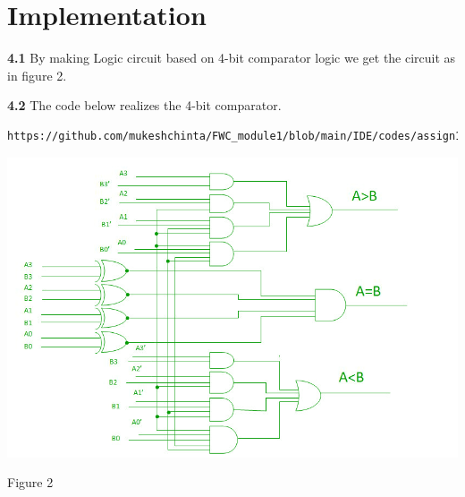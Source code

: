 \documentclass[10pt, a4paper]{article}
\begin{document}
\section{Implementation}
\textbf{4.1}
By making Logic circuit based on 4-bit comparator logic we get the circuit as in figure 2.

\textbf{4.2}
The code below realizes the 4-bit comparator.
\begin{lstlisting}
https://github.com/mukeshchinta/FWC_module1/blob/main/IDE/codes/assign1.txt
\end{lstlisting}



 \begin{center}
\includegraphics[scale=.40]{4bit.jpg}

\end{center}
\begin{center}
    Figure 2
\end{center}
\end{document}
